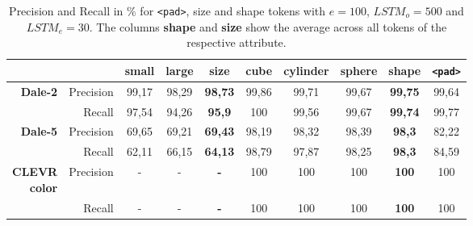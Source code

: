 \documentclass[11pt]{article}
\begin{document}
\begin{table}[ht]
        \centering
        \begin{tabular}{rr|cc|c|ccc|c|c}
                \toprule
                                                 &             & {small} & {large} & \textbf{size}  & {cube}  & {cylinder} & {sphere} & \textbf{shape} & {\texttt{<pad>}} \\\midrule
                \multirow{2}{*}{\textbf{Dale-2}} & {Precision} & {99,17} & {98,29} & \textbf{98,73} & {99,86} & {99,71}    & {99,67}  & \textbf{99,75} & {99,64} \\
                                                 & {Recall}    & {97,54} & {94,26} & \textbf{95,9}  & {100}   & {99,56}    & {99,67}  & \textbf{99,74} & {99,77} \\\midrule
                \multirow{2}{*}{\textbf{Dale-5}} & {Precision} & {69,65} & {69,21} & \textbf{69,43} & {98,19} & {98,32}    & {98,39}  & \textbf{98,3}  & {82,22} \\
                                                 & {Recall}    & {62,11} & {66,15} & \textbf{64,13} & {98,79} & {97,87}    & {98,25}  & \textbf{98,3}  & {84,59} \\\midrule
                \multirowcell{2}[0pt][r]{\textbf{CLEVR}                                                                                                          \\\textbf{color}} & {Precision}  & {-}     & {-}     & \textbf{-}     & {100}   & {100}      & {100}    & \textbf{100}   & {100}   \\
                                                 & {Recall}    & {-}     & {-}     & \textbf{-}     & {100}   & {100}      & {100}    & \textbf{100}   & {100}   \\
                \bottomrule
        \end{tabular}
        \caption{Precision and Recall in \% for \texttt{<pad>}, size and shape tokens with $e=100$, $LSTM_o=500$ and $LSTM_e=30$. The columns \textbf{shape} and \textbf{size} show the average across all tokens of the respective attribute.}
        \label{tab:results:bb-re-generator_size-shape}
\end{table}
\end{document}
